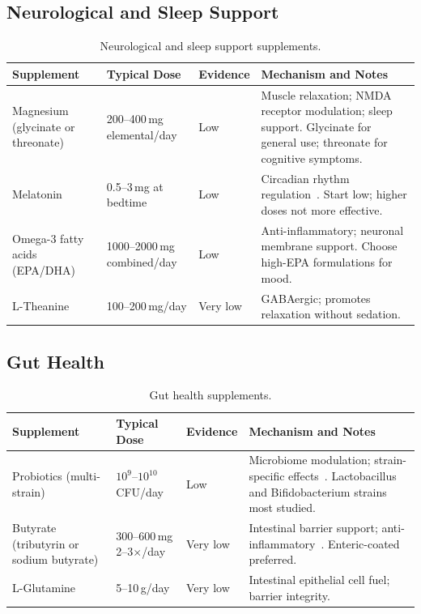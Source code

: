 \subsection{Neurological and Sleep Support}

\begin{table}[htbp]
\centering
\caption{Neurological and sleep support supplements.}
\label{tab:neuro-supplements}
\small
\begin{tabular}{p{2.8cm}p{2.5cm}p{1.5cm}p{4.5cm}}
\hline
\textbf{Supplement} & \textbf{Typical Dose} & \textbf{Evidence} & \textbf{Mechanism and Notes} \\
\hline
Magnesium (glycinate or threonate) & 200--400\,mg elemental/day & Low & Muscle relaxation; NMDA receptor modulation; sleep support. Glycinate for general use; threonate for cognitive symptoms. \\
Melatonin & 0.5--3\,mg at bedtime & Low & Circadian rhythm regulation~\cite{castromarrero2021melatonin}. Start low; higher doses not more effective. \\
Omega-3 fatty acids (EPA/DHA) & 1000--2000\,mg combined/day & Low & Anti-inflammatory; neuronal membrane support. Choose high-EPA formulations for mood. \\
L-Theanine & 100--200\,mg/day & Very low & GABAergic; promotes relaxation without sedation. \\
\hline
\end{tabular}
\end{table}

\subsection{Gut Health}

\begin{table}[htbp]
\centering
\caption{Gut health supplements.}
\label{tab:gut-supplements}
\small
\begin{tabular}{p{2.8cm}p{2.5cm}p{1.5cm}p{4.5cm}}
\hline
\textbf{Supplement} & \textbf{Typical Dose} & \textbf{Evidence} & \textbf{Mechanism and Notes} \\
\hline
Probiotics (multi-strain) & $10^9$--$10^{10}$ CFU/day & Low & Microbiome modulation; strain-specific effects~\cite{Hsu2025gut}. Lactobacillus and Bifidobacterium strains most studied. \\
Butyrate (tributyrin or sodium butyrate) & 300--600\,mg 2--3$\times$/day & Very low & Intestinal barrier support; anti-inflammatory~\cite{Folkerts2020butyrate}. Enteric-coated preferred. \\
L-Glutamine & 5--10\,g/day & Very low & Intestinal epithelial cell fuel; barrier integrity. \\
\hline
\end{tabular}
\end{table}

